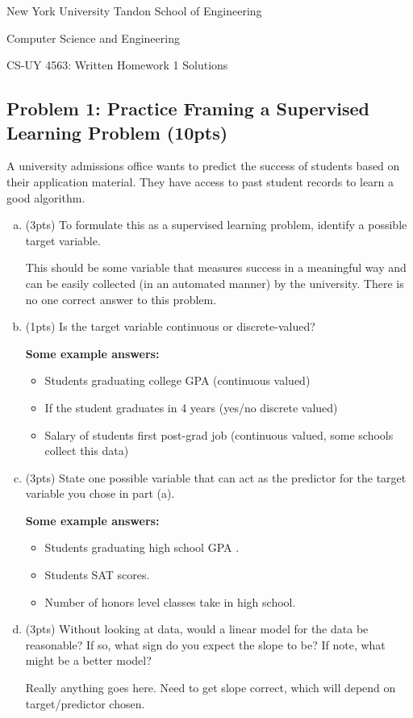 \documentclass[10pt]{article}
\begin{document}
	
\begin{center}
	\normalsize
	New York University Tandon School of Engineering
	
	Computer Science and Engineering
	\medskip
	
	\large
	CS-UY 4563: Written Homework 1 Solutions


\end{center} 

\subsection{Problem 1: Practice Framing a Supervised Learning Problem (10pts)}
 A university admissions office wants to predict the success of students based on
their application material.  They have access to past student records to learn
a good algorithm.
\begin{enumerate}[(a)]
	\item (3pts) To formulate this as a supervised learning problem,
	identify a possible target variable.  
	
	This should be some variable that measures success
	in a meaningful way and can be easily collected (in an automated manner) by the
	university. There is no one correct answer to this problem.
	\item  (1pts) Is the target variable continuous or discrete-valued?
	
	\textbf{Some example answers:}
	\begin{itemize}
		\item Students graduating college GPA (continuous valued)
		\item If the student graduates in 4 years (yes/no discrete valued)
		\item Salary of students first post-grad job (continuous valued, some schools collect this data)
	\end{itemize}
	\item  (3pts) State one possible variable that can act as the predictor for the target
	variable you chose in part (a).
	
	\textbf{Some example answers:}
		\begin{itemize}
		\item Students graduating high school GPA .
		\item Students SAT scores.
		\item Number of honors level classes take in high school.
	\end{itemize}
	\item (3pts) Without looking at data, would a linear model for the data be reasonable?
	If so, what sign do you expect the slope to be? If note, what might be a better model?
	
	Really anything goes here. Need to get slope correct, which will depend on target/predictor chosen.

\end{enumerate}
\end{document}
